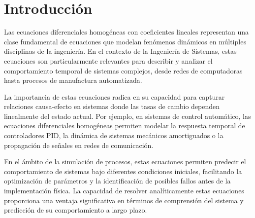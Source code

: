 \section{Introducción}

Las ecuaciones diferenciales homogéneas con coeficientes lineales representan una clase fundamental de ecuaciones que modelan fenómenos dinámicos en múltiples disciplinas de la ingeniería. En el contexto de la Ingeniería de Sistemas, estas ecuaciones son particularmente relevantes para describir y analizar el comportamiento temporal de sistemas complejos, desde redes de computadoras hasta procesos de manufactura automatizada.

La importancia de estas ecuaciones radica en su capacidad para capturar relaciones causa-efecto en sistemas donde las tasas de cambio dependen linealmente del estado actual. Por ejemplo, en sistemas de control automático, las ecuaciones diferenciales homogéneas permiten modelar la respuesta temporal de controladores PID, la dinámica de sistemas mecánicos amortiguados o la propagación de señales en redes de comunicación.

En el ámbito de la simulación de procesos, estas ecuaciones permiten predecir el comportamiento de sistemas bajo diferentes condiciones iniciales, facilitando la optimización de parámetros y la identificación de posibles fallos antes de la implementación física. La capacidad de resolver analíticamente estas ecuaciones proporciona una ventaja significativa en términos de comprensión del sistema y predicción de su comportamiento a largo plazo.
